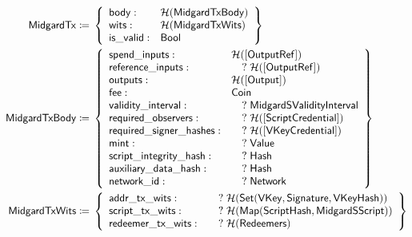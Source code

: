 \documentclass[../midgard.tex]{subfiles}
\begin{document}
\begingroup
\allowdisplaybreaks
\begin{align*}
    \mathsf{MidgardTx} \coloneq\;& \left\{
    \begin{array}{ll}
        \mathsf{body} : & \mathcal{H}(\mathsf{MidgardTxBody}) \\
        \mathsf{wits} : & \mathcal{H}(\mathsf{MidgardTxWits}) \\
        \mathsf{is\_valid} : & \mathsf{Bool} \\
    \end{array} \right\} \\
    \mathsf{MidgardTxBody} \coloneq\;& \left\{
    \begin{array}{ll}
        \mathsf{spend\_inputs} : & \mathcal{H}(\mathsf{[OutputRef]}) \\
        \mathsf{reference\_inputs} : & \quad?\;\mathcal{H}(\mathsf{[OutputRef]}) \\
        \mathsf{outputs} : & \mathcal{H}(\mathsf{[Output]}) \\
        \mathsf{fee} : & \mathsf{Coin} \\
        \mathsf{validity\_interval} : & \quad?\;\mathsf{MidgardSValidityInterval} \\
        \mathsf{required\_observers} : & \quad?\;\mathcal{H}(\mathsf{[ScriptCredential]}) \\
        \mathsf{required\_signer\_hashes} : & \quad?\;\mathcal{H}(\mathsf{[VKeyCredential]}) \\
        \mathsf{mint} : & \quad?\;\mathsf{Value} \\
        \mathsf{script\_integrity\_hash} : & \quad?\;\mathsf{Hash} \\
        \mathsf{auxiliary\_data\_hash} : & \quad?\;\mathsf{Hash} \\
        \mathsf{network\_id} : & \quad?\;\mathsf{Network}
    \end{array} \right\}\\
    \mathsf{MidgardTxWits} \coloneq\;& \left\{
    \begin{array}{ll}
        \mathsf{addr\_tx\_wits} : & \quad?\;\mathcal{H}(\mathsf{Set(VKey, Signature, VKeyHash)}) \\
        \mathsf{script\_tx\_wits} : & \quad?\;\mathcal{H}(\mathsf{Map(ScriptHash, MidgardSScript)}) \\
        \mathsf{redeemer\_tx\_wits} : & \quad?\;\mathcal{H}(\mathsf{Redeemers})
    \end{array} \right\}\\
\end{align*}
\endgroup
\end{document}

